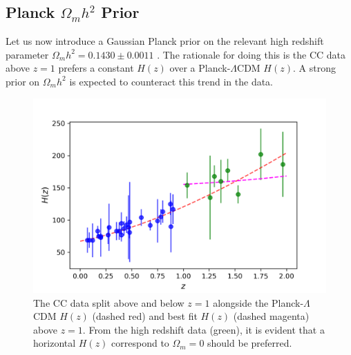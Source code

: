 \documentclass[aps,prl,10pt,twocolumn,superscriptaddress, nofootinbib]{revtex4}
\begin{document}
\subsection{Planck $\Omega_m h^2$ Prior}
Let us now introduce a Gaussian Planck prior on the relevant high redshift parameter $\Omega_m h^2 = 0.1430 \pm 0.0011$ \cite{Planck:2018vyg}. The rationale for doing this is the CC data above $z =1$ prefers a constant $H(z)$ over a Planck-$\Lambda$CDM $H(z)$. A strong prior on $\Omega_m h^2$ is expected to counteract this trend in the data. 

\begin{figure}[htb]
   \centering
\includegraphics[width=120mm]{pressureless_matter/CCdata.png}
\caption{The CC data split above and below $z=1$ alongside the Planck-$\Lambda$CDM $H(z)$ (dashed red) and best fit $H(z)$ (dashed magenta) above $z=1$. From the high redshift data (green), it is evident that a horizontal $H(z)$ correspond to $\Omega_m =0$ should be preferred.}
\label{fig:CC} 
\end{figure}
\end{document}

